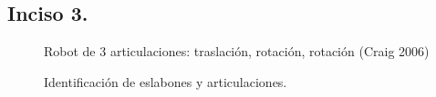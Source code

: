 \documentclass[a4paper,12pt]{article}
\begin{document}
\subsection{Inciso 3.}

\begin{figure}[H]
    \centering
    \begin{adjustbox}{scale = 0.7, max width=\columnwidth}
    \end{adjustbox}
    \caption{Robot de 3 articulaciones: traslación, rotación, rotación (Craig 2006)}
\end{figure}

\begin{figure}[H]
    \centering
    \begin{adjustbox}{scale = 0.7, max width=\columnwidth}
    \end{adjustbox}
    \caption{Identificación de eslabones y articulaciones.}
\end{figure}
\end{document}
